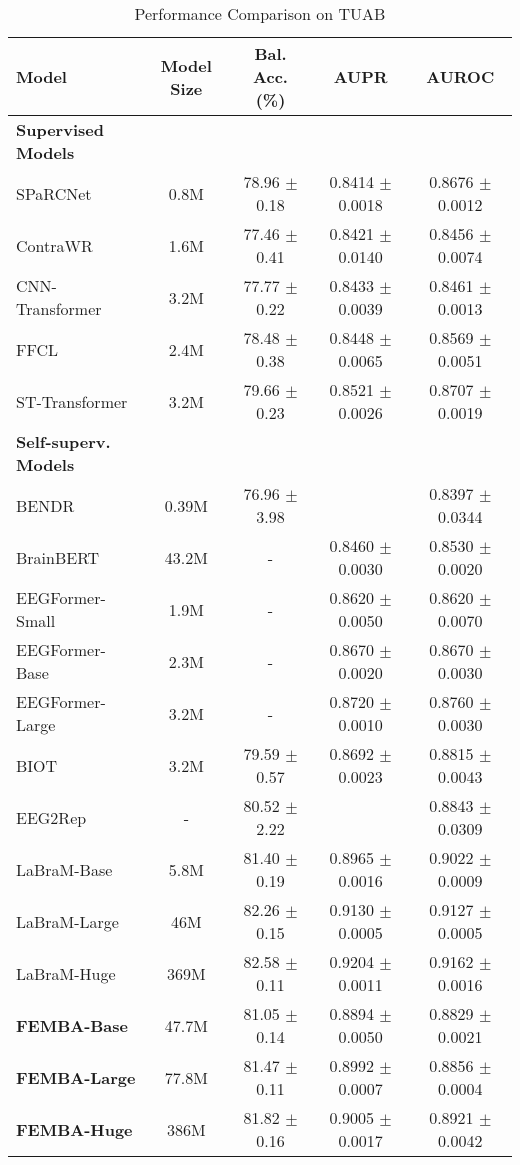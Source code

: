 \begin{table}[h!]
    \centering
    \caption{Performance Comparison on TUAB}
    \label{tab:results_tuab}
    \resizebox{\columnwidth}{!} {
    \setlength{\tabcolsep}{6pt} 
    \begin{tabular}{@{}lcccc@{}}
        \toprule
        \textbf{Model} & \textbf{Model Size} & \textbf{Bal. Acc. (\%)} & \textbf{AUPR} & \textbf{AUROC} \\ 
        \midrule
        \textbf{Supervised Models} \\
        SPaRCNet & 0.8M & 78.96 $\pm$ 0.18 & 0.8414 $\pm$ 0.0018 & 0.8676 $\pm$ 0.0012 \\
        ContraWR & 1.6M & 77.46 $\pm$ 0.41 & 0.8421 $\pm$ 0.0140 & 0.8456 $\pm$ 0.0074 \\
        CNN-Transformer & 3.2M & 77.77 $\pm$ 0.22 & 0.8433 $\pm$ 0.0039 & 0.8461 $\pm$ 0.0013 \\
        FFCL & 2.4M & 78.48 $\pm$ 0.38 & 0.8448 $\pm$ 0.0065 & 0.8569 $\pm$ 0.0051 \\
        ST-Transformer & 3.2M & 79.66 $\pm$ 0.23 & 0.8521 $\pm$ 0.0026 & 0.8707 $\pm$ 0.0019 \\
        \midrule
        \textbf{Self-superv. Models} \\
        BENDR & 0.39M & 76.96 $\pm$ 3.98 &  & 0.8397 $\pm$ 0.0344 \\
        BrainBERT & 43.2M & - & 0.8460 $\pm$ 0.0030 & 0.8530 $\pm$ 0.0020 \\
        EEGFormer-Small & 1.9M & - & 0.8620 $\pm$ 0.0050 & 0.8620 $\pm$ 0.0070 \\
        EEGFormer-Base & 2.3M & - & 0.8670 $\pm$ 0.0020 & 0.8670 $\pm$ 0.0030 \\
        EEGFormer-Large & 3.2M & - & 0.8720 $\pm$ 0.0010 & 0.8760 $\pm$ 0.0030 \\
        BIOT & 3.2M & 79.59 $\pm$ 0.57 & 0.8692 $\pm$ 0.0023 & 0.8815 $\pm$ 0.0043 \\
        EEG2Rep & - & 80.52 $\pm$ 2.22 &  & 0.8843 $\pm$ 0.0309 \\
        LaBraM-Base & 5.8M & 81.40 $\pm$ 0.19 & 0.8965 $\pm$ 0.0016 & 0.9022 $\pm$ 0.0009 \\
        LaBraM-Large & 46M & 82.26 $\pm$ 0.15 & 0.9130 $\pm$ 0.0005 & 0.9127 $\pm$ 0.0005 \\
        LaBraM-Huge & 369M & 82.58 $\pm$ 0.11 & 0.9204 $\pm$ 0.0011 & 0.9162 $\pm$ 0.0016 \\
        \midrule
        \textbf{FEMBA-Base} & 47.7M  &81.05 $\pm$ 0.14 &0.8894 $\pm$0.0050  & 0.8829 $\pm$ 0.0021  \\
        \textbf{FEMBA-Large} & 77.8M &  81.47 $\pm$ 0.11 & 0.8992 $\pm$ 0.0007  & 0.8856 $\pm$ 0.0004 \\
        \textbf{FEMBA-Huge} & 386M  & 81.82 $\pm$ 0.16 & 0.9005 $\pm$ 0.0017 & 0.8921 $\pm$ 0.0042  \\
        \bottomrule
   \end{tabular}}
   
\end{table}
